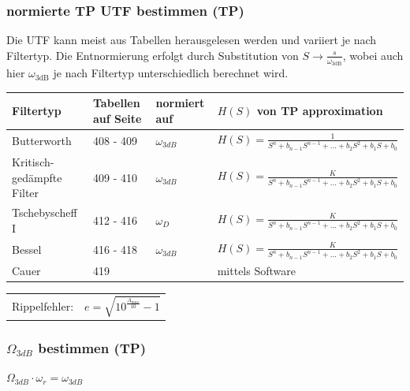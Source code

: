 \subsubsection{normierte TP UTF bestimmen (TP)}
\label{UTF bestimmen}
Die UTF kann meist aus Tabellen herausgelesen werden und variiert je nach
Filtertyp. Die Entnormierung erfolgt durch Substitution von $S \longrightarrow
\displaystyle\frac{s}{\omega_{\text{3dB}}}$, wobei auch hier
$\omega_{\text{3dB}}$ je nach Filtertyp unterschiedlich berechnet wird.

\label{LC_tabellen}
\renewcommand{\arraystretch}{1.5}
\begin{tabular}{|m{4cm}|m{1.5cm}|m{2.5cm}|m{9.5cm}|}
  \hline
    \textbf{Filtertyp} &
    \textbf{Tabellen auf Seite} &
    \textbf{normiert auf} &
    \textbf{$H(S)$ von TP approximation} \\
  \hline
    Butterworth &
    408 - 409 &
    $\omega_{3dB}$ &
    $ H(S) = \frac{1}{S^n +b_{n-1}S^{n-1}+\ldots+b_2S^2+b_1S+b_0}$ \\
  \hline
    Kritisch-gedämpfte Filter &
    409 - 410 &
    $\omega_{3dB}$ &
    $ H(S) = \frac{K}{S^n +b_{n-1}S^{n-1}+\ldots+b_2S^2+b_1S+b_0} $ \\
  \hline
    Tschebyscheff I &
    412 - 416 &
    $\omega_D$ &
    $ H(S) = \frac{K}{S^n +b_{n-1}S^{n-1}+\ldots+b_2S^2+b_1S+b_0}$ \\
  \hline
    Bessel &
    416 - 418 &
    $\omega_{3dB}$ &
    $ H(S) = \frac{K}{S^n +b_{n-1}S^{n-1}+\ldots+b_2S^2+b_1S+b_0}$ \\
  \hline
    Cauer &
    419 &
    &
    mittels Software \\
  \hline  
\end{tabular}
\renewcommand{\arraystretch}{1}
\begin{tabular}{ll}
  Rippelfehler: & \[e = \sqrt{10^{\frac{A_{max}}{10}}-1}\]
\end{tabular}




\subsubsection{$\Omega_{3dB}$ bestimmen (TP)}
\label{omega3dB}

$\boxed{\Omega_{3dB} \cdot \omega_r = \omega_{3dB}}$

